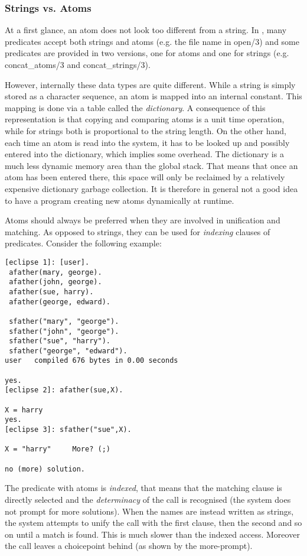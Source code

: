 \subsubsection{Strings vs. Atoms}
At a first glance, an atom does not look too different from a string.
In {\eclipse}, many predicates accept both strings and atoms (e.g. the file name
in open/3) and some predicates are provided in two versions, one for
atoms and one for strings (e.g. concat_atoms/3 and concat_strings/3).

However, internally these data types are quite different.
While a string is simply stored as a character sequence, an atom is mapped
into an internal constant.
This mapping is done via a table called the {\em dictionary}.
A consequence of this representation is that copying and comparing atoms
is a unit time operation, 
while for strings both is proportional to the string length.
On the other hand, each time an atom is read into the system, it has to
be looked up and possibly entered into the dictionary, which implies
some overhead.
The dictionary is a much less dynamic memory area than the global stack.
That means that once an atom has been entered there, this space will
only be reclaimed by a relatively expensive dictionary garbage collection.
It is therefore in general not a good idea to have a
program creating new atoms dynamically at runtime.

Atoms should always be preferred when they are involved in unification
and matching. As opposed to strings, they can be used for {\em indexing}
clauses of predicates.
Consider the following example:
\begin{verbatim}
[eclipse 1]: [user].
 afather(mary, george).
 afather(john, george).
 afather(sue, harry).
 afather(george, edward).

 sfather("mary", "george").
 sfather("john", "george").
 sfather("sue", "harry").
 sfather("george", "edward").
user   compiled 676 bytes in 0.00 seconds

yes.
[eclipse 2]: afather(sue,X).

X = harry
yes.
[eclipse 3]: sfather("sue",X).

X = "harry"     More? (;)

no (more) solution.
\end{verbatim}
The predicate with atoms is {\em indexed}, that means that the matching
clause is directly selected and the {\em determinacy} of the call is recognised
(the system does not prompt for more solutions).
When the names are instead written as strings, the system attempts
to unify the call with the first clause, then the second and so on until
a match is found. This is much slower than the indexed access.
Moreover the call leaves a choicepoint behind (as shown by the more-prompt).


